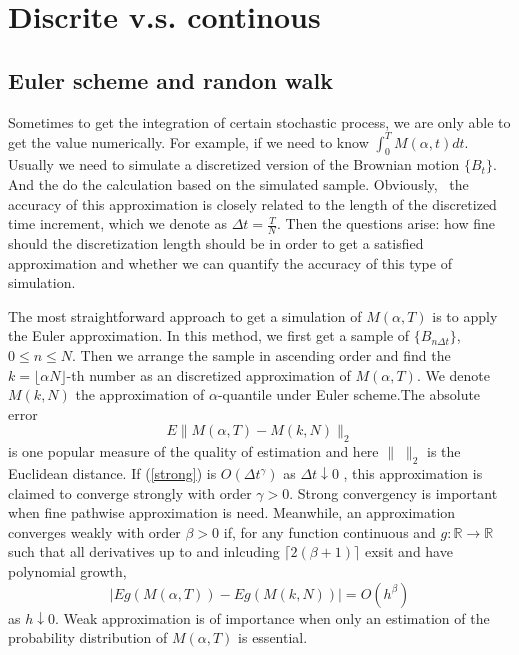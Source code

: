 \documentclass[11pt]{book}
\def\bR{{\mathbb{R}}}
\begin{document}
 
\section{Discrite v.s. continous}
\subsection{Euler scheme and randon walk}
Sometimes to get the integration of certain stochastic process, we are only able to get the value numerically. For example, if we need to know $\int^T_{0} M(\alpha , t)dt$. Usually we need to simulate a discretized version of the Brownian motion $\{B_t\}$. And the do the calculation based on the simulated sample. Obviously,  the accuracy of this approximation is closely related to the length of the discretized time increment, which we denote as $\Delta t= \frac{T}{N}$. Then the questions arise: how fine should the discretization length should be in order to get a satisfied approximation and whether we can quantify the accuracy of this type of simulation. 

The most straightforward approach to get a simulation of $M(\alpha , T)$ is to apply the Euler approximation. In this method, we first get a sample of $\{B_{n \Delta t}\}$, $0\leq n \leq N$. Then we arrange the sample in ascending order and find the $k= \lfloor \alpha  N\rfloor$-th number as an discretized approximation of $M(\alpha , T)$. We denote $M(k, N)$ the approximation of $\alpha$-quantile under Euler scheme.The absolute error 
\begin{equation}\label{strong}
E\|M(\alpha, T)-M(k,N)\|_2
\end{equation}
is one popular measure of the quality of estimation and here $\|\;\| _2$ is the Euclidean distance. If (\ref{strong}) is $O(\Delta t^\gamma)$ as $\Delta t \downarrow 0$ , this approximation is claimed to converge strongly with order $\gamma > 0 $. Strong convergency is important when fine pathwise approximation is need. Meanwhile, an approximation converges weakly with order $\beta > 0 $ if, for any function continuous and $g: \bR \to \bR$ such that all derivatives up to and inlcuding $\lceil 2(\beta + 1) \rceil$ exsit and have polynomial growth, 
\begin{equation}
|Eg(M(\alpha,T)) - Eg(M(k, N))| = O (h^\beta) 
\end{equation}
as $h \downarrow 0$. Weak approximation is of importance when only an estimation of the probability distribution of $M(\alpha, T)$ is essential.
\end{document}
